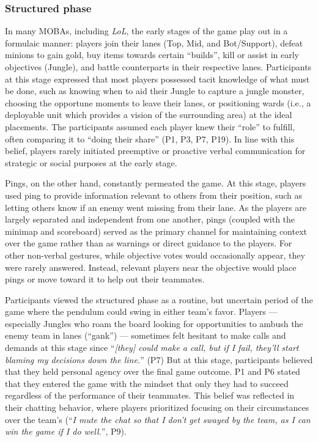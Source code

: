 \subsubsection{Structured phase}
In many MOBAs, including \textit{LoL}, the early stages of the game play out in a formulaic manner: players join their lanes (Top, Mid, and Bot/Support), defeat minions to gain gold, buy items towards certain ``builds'', kill or assist in early objectives (Jungle), and battle counterparts in their respective lanes. Participants at this stage expressed that most players possessed tacit knowledge of what must be done, such as knowing when to aid their Jungle to capture a jungle monster, choosing the opportune moments to leave their lanes, or positioning wards (i.e., a deployable unit which provides a vision of the surrounding area) at the ideal placements. The participants assumed each player knew their ``role'' to fulfill, often comparing it to ``doing their share'' (P1, P3, P7, P19). In line with this belief, players rarely initiated preemptive or proactive verbal communication for strategic or social purposes at the early stage. 

Pings, on the other hand, constantly permeated the game. At this stage, players used ping to provide information relevant to others from their position, such as letting others know if an enemy went missing from their lane. As the players are largely separated and independent from one another, pings (coupled with the minimap and scoreboard) served as the primary channel for maintaining context over the game rather than as warnings or direct guidance to the players. For other non-verbal gestures, while objective votes would occasionally appear, they were rarely answered. Instead, relevant players near the objective would place pings or move toward it to help out their teammates.

Participants viewed the structured phase as a routine, but uncertain period of the game where the pendulum could swing in either team's favor. Players --- especially Jungles who roam the board looking for opportunities to ambush the enemy team in lanes (``gank'') --- sometimes felt hesitant to make calls and demands at this stage since ``\textit{[they] could make a call, but if I fail, they'll start blaming my decisions down the line.}'' (P7) But at this stage, participants believed that they held personal agency over the final game outcome. P1 and P6 stated that they entered the game with the mindset that only they had to succeed regardless of the performance of their teammates. This belief was reflected in their chatting behavior, where players prioritized focusing on their circumstances over the team's (``\textit{I mute the chat so that I don't get swayed by the team, as I can win the game if I do well.}'', P9).


